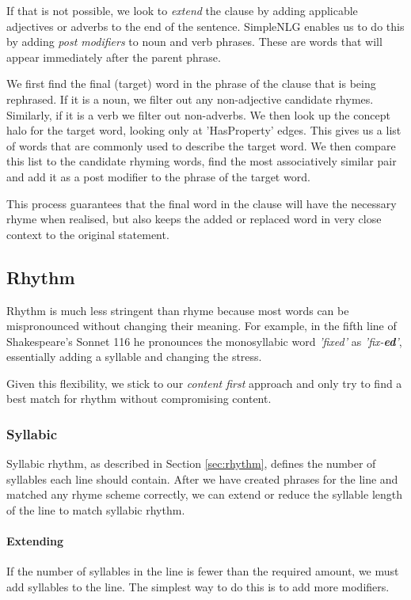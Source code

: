 If that is not possible, we look to \textit{extend} the clause by adding applicable adjectives or adverbs to the end of the sentence. SimpleNLG enables us to do this by adding \textit{post modifiers} to noun and verb phrases. These are words that will appear immediately after the parent phrase.

We first find the final (target) word in the phrase of the clause that is being rephrased. If it is a noun, we filter out any non-adjective candidate rhymes. Similarly, if it is a verb we filter out non-adverbs. We then look up the concept halo for the target word, looking only at 'HasProperty' edges. This gives us a list of words that are commonly used to describe the target word. We then compare this list to the candidate rhyming words, find the most associatively similar pair and add it as a post modifier to the phrase of the target word.

This process guarantees that the final word in the clause will have the necessary rhyme when realised, but also keeps the added or replaced word in very close context to the original statement.


\subsection{Rhythm}
Rhythm is much less stringent than rhyme because most words can be mispronounced without changing their meaning. For example, in the fifth line of Shakespeare's Sonnet 116 he pronounces the monosyllabic word \textit{'fixed'} as \textit{'fix-\textbf{ed}'}, essentially adding a syllable and changing the stress.

Given this flexibility, we stick to our \textit{content first} approach and only try to find a best match for rhythm without compromising content. 

\subsubsection{Syllabic}
Syllabic rhythm, as described in Section \ref{sec:rhythm}, defines the number of syllables each line should contain. After we have created phrases for the line and matched any rhyme scheme correctly, we can extend or reduce the syllable length of the line to match syllabic rhythm.

\paragraph{Extending}
If the number of syllables in the line is fewer than the required amount, we must add syllables to the line. The simplest way to do this is to add more modifiers.

